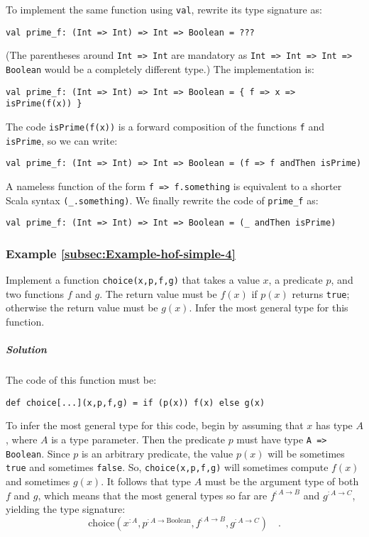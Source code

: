 To implement the same function using \lstinline!val!, rewrite its
type signature as:
\begin{lstlisting}
val prime_f: (Int => Int) => Int => Boolean = ???
\end{lstlisting}
(The parentheses around \lstinline!Int => Int! are mandatory as \lstinline!Int => Int => Int => Boolean!
would be a completely different type.) The implementation is:
\begin{lstlisting}
val prime_f: (Int => Int) => Int => Boolean = { f => x => isPrime(f(x)) }
\end{lstlisting}
The code \lstinline!isPrime(f(x))! is a forward composition of the
functions \lstinline!f! and \lstinline!isPrime!, so we can write:
\begin{lstlisting}
val prime_f: (Int => Int) => Int => Boolean = (f => f andThen isPrime)
\end{lstlisting}
A nameless function of the form \lstinline!f => f.something! is equivalent
to a shorter Scala syntax \lstinline!(_.something)!. We finally rewrite
the code of \lstinline!prime_f! as:
\begin{lstlisting}
val prime_f: (Int => Int) => Int => Boolean = (_ andThen isPrime)
\end{lstlisting}


\subsubsection{Example \label{subsec:Example-hof-simple-4}\ref{subsec:Example-hof-simple-4}}

Implement a function \lstinline!choice(x,p,f,g)! that takes a value
$x$, a predicate $p$, and two functions $f$ and $g$. The return
value must be $f(x)$ if $p(x)$ returns \lstinline!true!; otherwise
the return value must be $g(x)$. Infer the most general type for
this function.

\subparagraph{Solution}

The code of this function must be:
\begin{lstlisting}
def choice[...](x,p,f,g) = if (p(x)) f(x) else g(x)
\end{lstlisting}
To infer the most general type for this code, begin by assuming that
$x$ has type $A$, where $A$ is a type parameter. Then the predicate
$p$ must have type \lstinline!A => Boolean!. Since $p$ is an arbitrary
predicate, the value $p(x)$ will be sometimes \lstinline!true! and
sometimes \lstinline!false!. So, \lstinline!choice(x,p,f,g)! will
sometimes compute $f(x)$ and sometimes $g(x)$. It follows that type
$A$ must be the argument type of both $f$ and $g$, which means
that the most general types so far are $f^{:A\rightarrow B}$ and
$g^{:A\rightarrow C}$, yielding the type signature:
\[
\text{choice}(x^{:A},p^{:A\rightarrow\text{Boolean}},f^{:A\rightarrow B},g^{:A\rightarrow C})\quad.
\]

